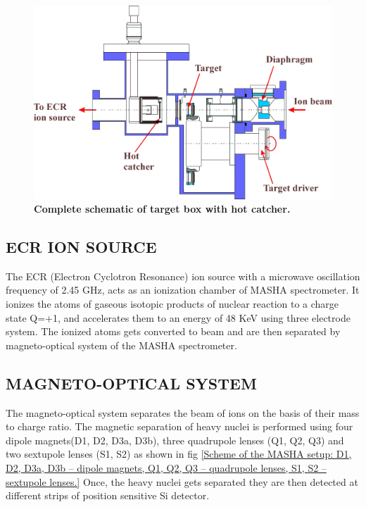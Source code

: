 \documentclass[12pt]{article}
\begin{document}
\begin{figure}[h]
\centering
\includegraphics[scale=0.95]{TBHC.png}
\caption{\textbf{Complete schematic of target box with hot catcher.}}
\label{Complete schematic of target box with hot catcher.}
\end{figure}

\subsection{ECR ION SOURCE}
The ECR (Electron Cyclotron Resonance) ion source with a microwave oscillation frequency of 2.45 GHz\cite{rodin2014separation}, acts as an ionization chamber of MASHA spectrometer. It ionizes the atoms of gaseous isotopic products of nuclear reaction to a charge state Q=+1, and accelerates them to an energy of 48 KeV using three electrode system. The ionized atoms gets converted to beam and are then separated by magneto-optical system of the MASHA spectrometer.

\subsection{MAGNETO-OPTICAL SYSTEM}
The magneto-optical system separates the beam of ions on the basis of their mass to charge ratio. The magnetic separation of heavy nuclei is performed using four dipole magnets(D1, D2, D3a, D3b), three quadrupole lenses (Q1, Q2, Q3) and two sextupole lenses (S1, S2) as shown in fig \ref{Scheme of the MASHA setup: D1, D2, D3a, D3b – dipole magnets, Q1, Q2, Q3 – quadrupole lenses, S1, S2 – sextupole lenses.} Once, the heavy nuclei gets separated they are then detected at different strips of position sensitive Si detector.
\end{document}
